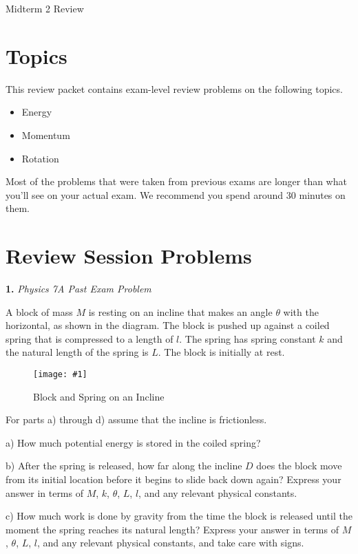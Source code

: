\documentclass[11pt]{article}
\newcommand{\fig}[4]{
    \begin{figure}[H]
        \centering
        \texttt{[image: \#1]}
        \caption{#2}
        \label{exp4fit}
    \end{figure}
}
\theoremstyle{gangnamstyle}{\newtheorem{definition}{Definition}[]}
\theoremstyle{gangnamstyle}{\newtheorem{example}{Example}[]}
\theoremstyle{gangnamstyle}{\newtheorem{problem}{Problem}[]}
\begin{document}
\normalfont
\pagestyle{pages}


\begin{center}
\vspace{3in}
{\Large Midterm 2 Review } \\ [0.05in]
\end{center}

\section*{Topics}
This review packet contains exam-level review problems on the following topics. 
\begin{itemize}
\item Energy
\item Momentum
\item Rotation
\end{itemize}
Most of the problems that were taken from previous exams are longer than what you'll see on your actual exam. We recommend you spend around 30 minutes on them. 



\section{Review Session Problems}

\textbf{1.} \textit{Physics 7A Past Exam Problem}

A block of mass $M$ is resting on an incline that makes an angle $\theta$ with the horizontal, as shown in the diagram. The block is pushed up against a coiled spring that is compressed to a length of $l$. The spring has spring constant $k$ and the natural length of the spring is $L$. The block is initially at rest. 

\fig{figs/mt2/deweese1.png}{Block and Spring on an Incline}{0.65}{0}

For parts a) through d) assume that the incline is frictionless.

a) How much potential energy is stored in the coiled spring?

b) After the spring is released, how far along the incline $D$ does the block move from its initial location before it begins to slide back down again? Express your answer in terms of $M$, $k$, $\theta$, $L$, $l$, and any relevant physical constants.

c) How much work is done by gravity from the time the block is released until the moment the spring reaches its natural length? Express your answer in terms of $M$, $\theta$, $L$, $l$, and any relevant physical constants, and take care with signs.
\end{document}
